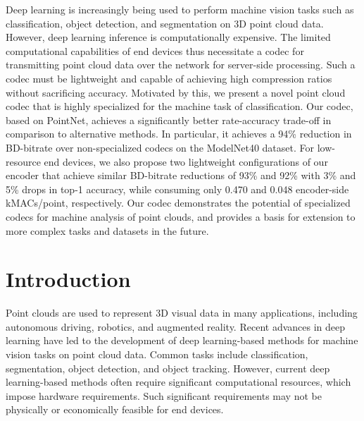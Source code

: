 \begin{chapabstract}
  Deep learning is increasingly being used to perform machine vision tasks such as classification, object detection, and segmentation on 3D point cloud data.
  However, deep learning inference is computationally expensive.
  The limited computational capabilities of end devices thus necessitate a codec for transmitting point cloud data over the network for server-side processing.
  Such a codec must be lightweight and capable of achieving high compression ratios without sacrificing accuracy.
  Motivated by this, we present a novel point cloud codec that is highly specialized for the machine task of classification.
  Our codec, based on PointNet, achieves a significantly better rate-accuracy trade-off in comparison to alternative methods.
  In particular, it achieves a 94\% reduction in BD-bitrate over non-specialized codecs on the ModelNet40 dataset.
  For low-resource end devices, we also propose two lightweight configurations of our encoder that achieve similar BD-bitrate reductions of 93\% and 92\% with 3\% and 5\% drops in top-1 accuracy, while consuming only 0.470 and 0.048 encoder-side kMACs/point, respectively.
  Our codec demonstrates the potential of specialized codecs for machine analysis of point clouds, and provides a basis for extension to more complex tasks and datasets in the future.
\end{chapabstract}




\section{Introduction}
\label{sec:introduction}

Point clouds are used to represent 3D visual data in many applications, including autonomous driving, robotics, and augmented reality.
Recent advances in deep learning have led to the development of deep learning-based methods for machine vision tasks on point cloud data.
Common tasks include classification, segmentation, object detection, and object tracking.
However, current deep learning-based methods often require significant computational resources, which impose hardware requirements.
Such significant requirements may not be physically or economically feasible for end devices.

